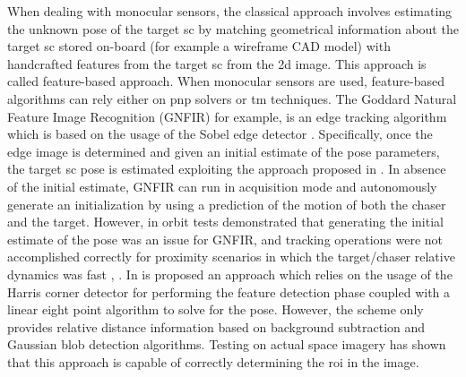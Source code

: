 When dealing with monocular sensors, the classical approach involves estimating the unknown pose of the target \acrshort{sc} by matching geometrical information about the target \acrshort{sc} stored on-board (for example a wireframe CAD model) with handcrafted features from the target \acrshort{sc} from the \acrshort{2d} image. This approach is called feature-based approach. When monocular sensors are used, feature-based algorithms can rely either on \acrshort{pnp} solvers or \acrfull{tm} techniques.
The Goddard Natural Feature Image Recognition (GNFIR) for example, is an edge tracking algorithm which is based on the usage of the Sobel edge detector \cite{Opromolla2017}. Specifically, once the edge image is determined and given an initial estimate of the pose parameters, the target \acrshort{sc} pose is estimated exploiting the approach proposed in \cite{Drummond2002}. In absence of the initial estimate, GNFIR can run in acquisition mode and autonomously generate an initialization by using a prediction of the motion of both the chaser and the target. However, in orbit tests demonstrated that generating the initial estimate of the pose was an issue for GNFIR, and tracking operations were not accomplished correctly for proximity scenarios in which the target/chaser relative dynamics was fast \cite{D2014}, \cite{Naasz2010}.
In \cite{Grompone2015} is proposed an approach which relies on the usage of the Harris corner detector \cite{Harris1988ACC} for performing the feature detection phase coupled with a linear eight point algorithm to solve for the pose. However, the scheme only provides relative distance information based on background subtraction and Gaussian blob detection algorithms. Testing on actual space imagery has shown that this approach is capable of correctly determining the \acrshort{roi} in the image.
